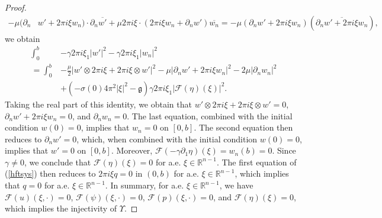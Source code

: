 \documentclass[11pt,letterpaper,reqno]{amsart}
\numberwithin{equation}{section}
\newcommand{\abs}[1]{\left\lvert#1\right\rvert}
\begin{document}
\begin{proof}
\begin{align}
        -\mu(\partial_{n}&w'+2\pi i \xi w_{n})\cdot \partial_{n}\overline{w'}+\mu 2\pi i \xi \cdot(2\pi i \xi w_{n}+\partial_{n}w')\overline{w_{n}} =-\mu(\partial_{n}w'+2\pi i \xi w_{n})(\overline{\partial_{n}w'+2\pi i \xi w_{n}}),
    \end{align}
    we obtain
    \begin{align}
        \int_{0}^{b}&-\gamma2\pi i \xi_{1}\abs{w'}^{2}-\gamma2\pi i \xi_{1}\abs{w_{n}}^{2} \nonumber\\
        = \int_{0}^{b}&-\frac{\mu}{2}\abs{w' \otimes 2\pi i \xi + 2\pi i \xi \otimes w'}^{2}-\mu\abs{\partial_{n}w'+2\pi i \xi w_{n}}^{2}-2\mu\abs{\partial_{n}w_{n}}^{2}   \nonumber\\
        &+(-\sigma(0)4\pi^{2}\abs{\xi}^{2}-\mathfrak{g})\gamma2\pi i \xi_{1}\abs{\mathcal{F}(\eta)(\xi)}^{2}. \label{velid}
    \end{align}
    Taking the real part of this identity, we obtain that \(w' \otimes 2\pi i \xi + 2\pi i \xi \otimes w'=0\), \(\partial_{n}w'+2\pi i \xi w_{n}=0\), and \(\partial_{n}w_{n}=0\). The last equation, combined with the initial condition \(w(0)=0\), implies that \(w_{n}=0\) on \([0,b]\). The second equation then reduces to \(\partial_{n}w'=0\), which, when combined with the initial condition \(w(0)=0\), implies that \(w'=0\) on \([0,b]\). Moreover, \(\mathcal{F}(-\gamma\partial_{1}\eta)(\xi)=w_{n}(b)=0\). Since \(\gamma \neq 0\), we conclude that \(\mathcal{F}(\eta)(\xi)=0\) for a.e. \(\xi \in \mathbb{R}^{n-1}\). The first equation of (\ref{hftsys}) then reduces to \(2\pi i \xi q=0\) in \((0,b)\) for a.e. \(\xi \in \mathbb{R}^{n-1}\), which implies that \(q=0\) for a.e. \(\xi \in \mathbb{R}^{n-1}\). In summary, for a.e. \(\xi \in \mathbb{R}^{n-1}\), we have \(\mathcal{F}(u)(\xi,\cdot)=0\), \(\mathcal{F}(\psi)(\xi,\cdot)=0\), \(\mathcal{F}(p)(\xi,\cdot)=0\), and \(\mathcal{F}(\eta)(\xi)=0\), which implies the injectivity of \(\Upsilon\).
\end{proof}
\end{document}
